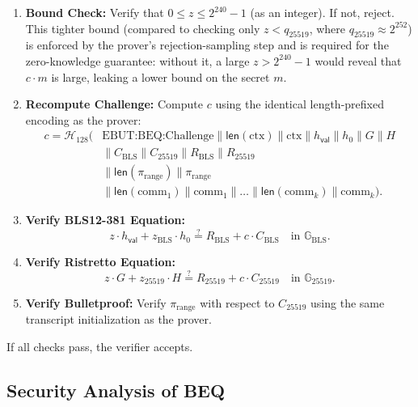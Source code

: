 \documentclass[11pt]{article}
\theoremstyle{definitionstyle}
\theoremstyle{plain}
\begin{document}
\begin{enumerate}[leftmargin=*]
\item \textbf{Bound Check:}
  Verify that $0 \le z \le 2^{240}-1$ (as an integer). If not, reject. This tighter bound (compared to checking only $z < q_{25519}$, where $q_{25519} \approx 2^{252}$) is enforced by the prover's rejection-sampling step and is required for the zero-knowledge guarantee: without it, a large $z > 2^{240}-1$ would reveal that $c \cdot m$ is large, leaking a lower bound on the secret $m$.

\item \textbf{Recompute Challenge:}
  Compute $c$ using the identical length-prefixed encoding as the prover:
  \[
  \begin{aligned}
  c = \mathcal{H}_{128}\!\bigl(&\text{EBUT:BEQ:Challenge} \parallel \mathsf{len}(\text{ctx}) \parallel \text{ctx} \parallel h_{\mathsf{val}} \parallel h_0 \parallel G \parallel H \\
  &\parallel C_{\text{BLS}} \parallel C_{25519} \parallel R_{\text{BLS}} \parallel R_{25519} \\
  &\parallel \mathsf{len}(\pi_{\text{range}}) \parallel \pi_{\text{range}} \\
  &\parallel \mathsf{len}(\text{comm}_1) \parallel \text{comm}_1 \parallel \dots \parallel \mathsf{len}(\text{comm}_k) \parallel \text{comm}_k\bigr).
  \end{aligned}
  \]

\item \textbf{Verify BLS12-381 Equation:}
  \[
  z \cdot h_{\mathsf{val}} + z_{\text{BLS}} \cdot h_0 \stackrel{?}{=} R_{\text{BLS}} + c \cdot C_{\text{BLS}} \quad \text{in } \mathbb{G}_{\text{BLS}}.
  \]

\item \textbf{Verify Ristretto Equation:}
  \[
  z \cdot G + z_{25519} \cdot H \stackrel{?}{=} R_{25519} + c \cdot C_{25519} \quad \text{in } \mathbb{G}_{25519}.
  \]

\item \textbf{Verify Bulletproof:}
  Verify $\pi_{\text{range}}$ with respect to $C_{25519}$ using the same transcript initialization as the prover.
\end{enumerate}

If all checks pass, the verifier accepts.

\subsection{Security Analysis of BEQ}
\end{document}
